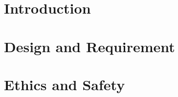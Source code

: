 \documentclass[12pt]{article}
\begin{document}

\clearpage
\section{Introduction}

\clearpage

\clearpage
\section{Design and Requirement}

\clearpage

\clearpage
\section{Ethics and Safety}

\clearpage

\printbibliography[heading=bibintoc, title={References}]

%     
\end{document}
